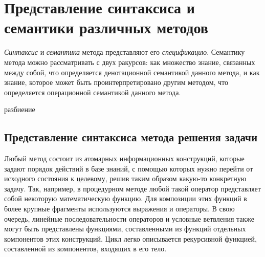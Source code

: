 \section{Представление синтаксиса и семантики различных методов}

\textit{Синтаксис} и \textit{семантика} метода представляют его \textit{спецификацию}. Семантику метода можно рассматривать с двух ракурсов: как множество знание, связанных между собой, что определяется денотационной семантикой данного метода, и как знание, которое может быть проинтерпретировано другим методом, что определяется операционной семантикой данного метода.

\begin{SCn}
\begin{scnrelfromset}{разбиение}
    \begin{scnindent}
    \end{scnindent}
    \begin{scnindent}
    \end{scnindent}
\end{scnrelfromset}
\end{SCn}

\subsection{Представление синтаксиса метода решения задачи}

Любый метод состоит из атомарных информационных конструкций, которые задают порядок действий в базе знаний, с помощью которых нужно перейти от исходного состояния к \underline{целевому}, решив таким образом какую-то конкретную задачу. Так, например, в процедурном методе любой такой оператор представляет собой некоторую математическую функцию. Для композиции этих функций в более крупные фрагменты используются выражения и операторы. В свою очередь, линейные последовательности операторов и условные ветвления также могут быть представлены функциями, составленными из функций отдельных компонентов этих конструкций. Цикл легко описывается рекурсивной функцией, составленной из компонентов, входящих в его тело.

